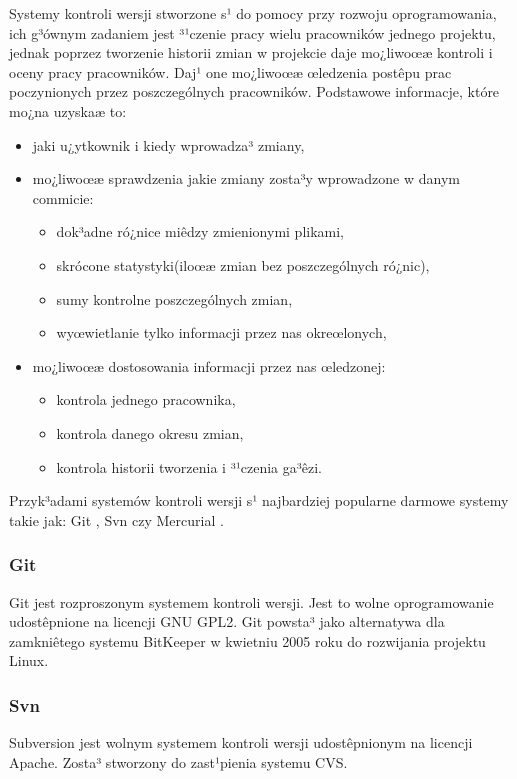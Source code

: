 Systemy kontroli wersji stworzone s¹ do pomocy przy rozwoju oprogramowania, ich g³ównym zadaniem jest ³¹czenie pracy wielu pracowników jednego projektu, jednak poprzez tworzenie historii zmian w projekcie daje mo¿liwoœæ kontroli i oceny pracy pracowników.
Daj¹ one mo¿liwoœæ œledzenia postêpu prac poczynionych przez poszczególnych pracowników. Podstawowe informacje, które mo¿na uzyskaæ to:
\begin{itemize}
	\item jaki u¿ytkownik i kiedy wprowadza³ zmiany,
	\item mo¿liwoœæ sprawdzenia jakie zmiany zosta³y wprowadzone w danym commicie:
	\begin{itemize}
		\item dok³adne ró¿nice miêdzy zmienionymi plikami,
		\item skrócone statystyki(iloœæ zmian bez poszczególnych ró¿nic),
		\item sumy kontrolne poszczególnych zmian,
		\item wyœwietlanie tylko informacji przez nas okreœlonych,
	\end{itemize}
	
	\item mo¿liwoœæ dostosowania informacji przez nas œledzonej: 
	\begin{itemize}
		\item kontrola jednego pracownika,
		\item kontrola danego okresu zmian,
		\item kontrola historii tworzenia i ³¹czenia ga³êzi.
	\end{itemize}

\end{itemize}

Przyk³adami systemów kontroli wersji s¹ najbardziej popularne darmowe systemy takie jak: Git
\cite{website:git}, Svn \cite{website:svn} czy  Mercurial \cite{website:mercurial}.



	\subsubsection{Git}
	Git jest rozproszonym systemem kontroli wersji. Jest to wolne oprogramowanie udostêpnione na licencji
	GNU GPL2. Git powsta³ jako alternatywa dla zamkniêtego systemu BitKeeper w kwietniu 2005 roku do
	rozwijania projektu Linux.
	
	\subsubsection{Svn}
	Subversion jest wolnym systemem kontroli wersji udostêpnionym na licencji Apache. Zosta³ stworzony do
	zast¹pienia systemu CVS.
	
